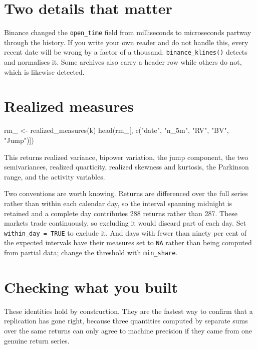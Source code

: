 \documentclass[11pt,a4paper]{report}
\begin{document}
\section{Two details that matter}

Binance changed the \texttt{open\_time} field from milliseconds to
microseconds partway through the history. If you write your own reader
and do not handle this, every recent date will be wrong by a factor of a
thousand. \texttt{binance\_klines()} detects and normalises it. Some
archives also carry a header row while others do not, which is likewise
detected.

\section{Realized measures}

\begin{Rblock}
rm_ <- realized_measures(k)
head(rm_[, c("date", "n_5m", "RV", "BV", "Jump")])
\end{Rblock}

This returns realized variance, bipower variation, the jump component,
the two semivariances, realized quarticity, realized skewness and
kurtosis, the Parkinson range, and the activity variables.

Two conventions are worth knowing. Returns are differenced over the full
series rather than within each calendar day, so the interval spanning
midnight is retained and a complete day contributes 288 returns rather
than 287. These markets trade continuously, so excluding it would
discard part of each day. Set \texttt{within\_day = TRUE} to exclude it.
And days with fewer than ninety per cent of the expected intervals have
their measures set to \texttt{NA} rather than being computed from
partial data; change the threshold with \texttt{min\_share}.

\section{Checking what you built}


These identities hold by construction. They are the fastest way to
confirm that a replication has gone right, because three quantities
computed by separate sums over the same returns can only agree to
machine precision if they came from one genuine return series.
\end{document}
